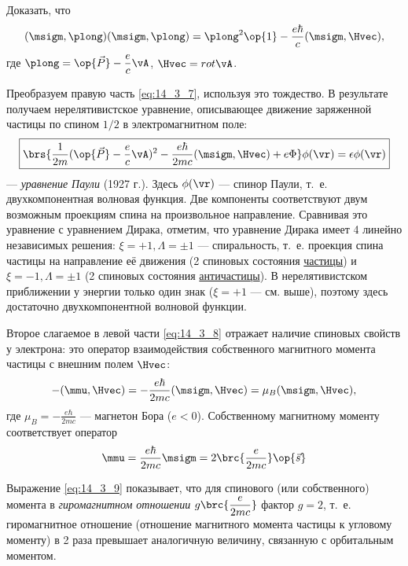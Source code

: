 \begin{excr}
Доказать, что
$$
(\msigm, \plong)(\msigm, \plong) = \plong^2 \op{1} - \frac{e\hbar}{c}(\msigm, \Hvec),
$$
где $\plong = \op{\vec{P}} - \dfrac{e}{c} \vA$, $\Hvec = rot \vA$.
\end{excr}

Преобразуем правую часть \eqref{eq:14_3_7}, используя это тождество. В результате получаем нерелятивистское уравнение, описывающее движение заряженной частицы по спином $1/2$ в электромагнитном поле:
\begin{equation}
\label{eq:14_3_8}
\boxed{\brs{\frac{1}{2m} (\op{\vec{P}} - \frac{e}{c} \vA)^2 - \frac{e\hbar}{2mc} (\msigm, \Hvec) + e\Phi}\phi(\vr) = \epsilon \phi(\vr)}
\end{equation}
--- {\em уравнение Паули} (1927 г.). Здесь $\phi(\vr)$ --- спинор Паули, т.~е. двухкомпонентная волновая функция. Две компоненты соответствуют двум возможным проекциям спина на произвольное направление. Сравнивая это уравнение с уравнением Дирака, отметим, что уравнение Дирака имеет 4 линейно независимых решения: $\xi = +1, \Lambda = \pm 1$ --- спиральность, т.~е. проекция спина частицы на направление её движения (2 спиновых состояния \underline{частицы}) и $\xi = -1, \Lambda = \pm 1$ (2 спиновых состояния \underline{античастицы}). В нерелятивистском приближении у энергии только один знак ($\xi = +1$ --- см. выше), поэтому здесь достаточно двухкомпонентной волновой функции.

Второе слагаемое в левой части \eqref{eq:14_3_8} отражает наличие спиновых свойств у электрона: это оператор взаимодействия собственного магнитного момента частицы с внешним полем $\Hvec$:
$$
- (\mmu, \Hvec) = - \frac{e\hbar}{2mc}(\msigm, \Hvec) = \mu_B (\msigm, \Hvec), 
$$
где $\mu_B = -\frac{e\hbar}{2mc}$ --- магнетон Бора ($e < 0$). Собственному магнитному моменту соответствует оператор
\begin{equation}
\label{eq:14_3_9}
\mmu = \frac{e\hbar}{2mc} \msigm = 2 \brc{\frac{e}{2mc}}\op{\vec{s}}
\end{equation}

Выражение \eqref{eq:14_3_9} показывает, что для спинового (или собственного) момента в {\em гиромагнитном отношении} $g\brc{\dfrac{e}{2mc}}$ фактор $g = 2$, т.~е. гиромагнитное отношение (отношение магнитного момента частицы к угловому моменту) в 2 раза превышает аналогичную величину, связанную с орбитальным моментом.

